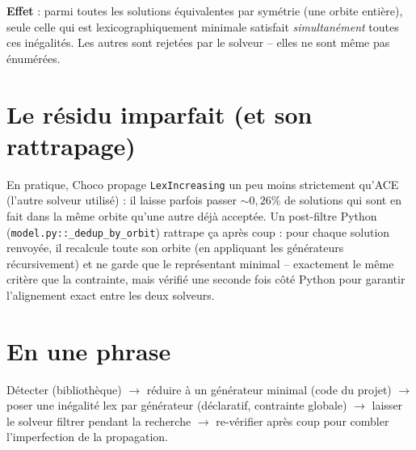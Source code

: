 \documentclass[11pt,a4paper]{article}
\begin{document}
\textbf{Effet} : parmi toutes les solutions équivalentes par symétrie
(une orbite entière), seule celle qui est lexicographiquement minimale
satisfait \emph{simultanément} toutes ces inégalités. Les autres sont
rejetées par le solveur -- elles ne sont même pas énumérées.

\section{Le résidu imparfait (et son rattrapage)}

En pratique, Choco propage \texttt{LexIncreasing} un peu moins
strictement qu'ACE (l'autre solveur utilisé) : il laisse parfois passer
${\sim}0{,}26\%$ de solutions qui sont en fait dans la même orbite
qu'une autre déjà acceptée. Un post-filtre Python
(\texttt{model.py::\_dedup\_by\_orbit}) rattrape ça après coup : pour
chaque solution renvoyée, il recalcule toute son orbite (en appliquant
les générateurs récursivement) et ne garde que le représentant minimal
-- exactement le même critère que la contrainte, mais vérifié une
seconde fois côté Python pour garantir l'alignement exact entre les
deux solveurs.

\section*{En une phrase}

Détecter (bibliothèque) $\rightarrow$ réduire à un générateur minimal
(code du projet) $\rightarrow$ poser une inégalité lex par générateur
(déclaratif, contrainte globale) $\rightarrow$ laisser le solveur
filtrer pendant la recherche $\rightarrow$ re-vérifier après coup pour
combler l'imperfection de la propagation.
\end{document}
